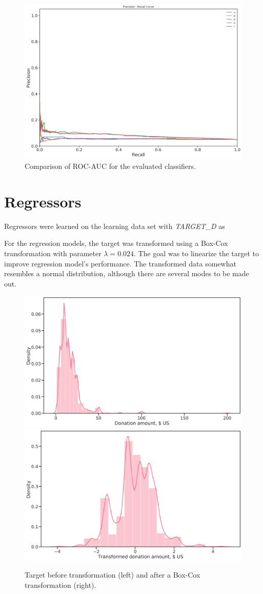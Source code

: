 \documentclass[
  11pt,
  a4paper,
  DIV=12,captions=tableheading,oneside,titlepage=firstiscover,abstracton]{scrreprt}
\begin{document}
\begin{figure}

{\centering \includegraphics[width=0.6\linewidth]{figures/learning/prec_rec_compared_refit_recall} 

}

\caption{Comparison of ROC-AUC for the evaluated classifiers.}\label{fig:p-r-curve}
\end{figure}

\hypertarget{regressors}{%
\section{Regressors}\label{regressors}}

Regressors were learned on the learning data set with \emph{TARGET\_D} as

For the regression models, the target was transformed using a Box-Cox transformation with parameter \(\lambda=0.024\). The goal was to linearize the target to improve regression model's performance. The transformed data somewhat resembles a normal distribution, although there are several modes to be made out.

\begin{figure}

{\centering \includegraphics[width=0.49\linewidth]{figures/predictions/target_d-distribution} \includegraphics[width=0.49\linewidth]{figures/predictions/target_d-distribution-transformed} 

}

\caption{Target before transformation (left) and after a Box-Cox transformation (right).}\label{fig:reg-targ-transform}
\end{figure}
\end{document}
